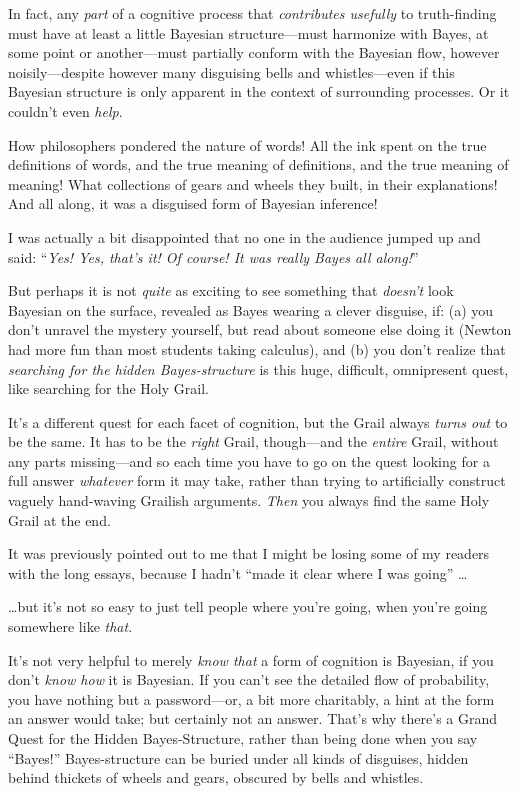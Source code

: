 {
 In fact, any \textit{part} of a cognitive process that
\textit{contributes usefully} to truth-finding must have at least a
little Bayesian structure---must harmonize with Bayes, at some point or
another---must partially conform with the Bayesian flow, however
noisily---despite however many disguising bells and whistles---even if
this Bayesian structure is only apparent in the context of surrounding
processes. Or it couldn't even \textit{help}.}

{
 How philosophers pondered the nature of words! All the ink spent
on the true definitions of words, and the true meaning of definitions,
and the true meaning of meaning! What collections of gears and wheels
they built, in their explanations! And all along, it was a disguised
form of Bayesian inference!}

{
 I was actually a bit disappointed that no one in the audience
jumped up and said: ``\textit{Yes! Yes,
that's it! Of course! It was really Bayes all
along!}''}

{
 But perhaps it is not \textit{quite} as exciting to see something
that \textit{doesn't} look Bayesian on the surface,
revealed as Bayes wearing a clever disguise, if: (a) you
don't unravel the mystery yourself, but read about
someone else doing it (Newton had more fun than most students taking
calculus), and (b) you don't realize that
\textit{searching for the hidden Bayes-structure} is this huge,
difficult, omnipresent quest, like searching for the Holy Grail.}

{
 It's a different quest for each facet of
cognition, but the Grail always \textit{turns out} to be the same. It
has to be the \textit{right} Grail, though---and the \textit{entire}
Grail, without any parts missing---and so each time you have to go on
the quest looking for a full answer \textit{whatever} form it may take,
rather than trying to artificially construct vaguely hand-waving
Grailish arguments. \textit{Then} you always find the same Holy Grail
at the end.}

{
 It was previously pointed out to me that I might be losing some of
my readers with the long essays, because I hadn't
``made it clear where I was going''
\ldots}

{
 \ldots but it's not so easy to just tell people
where you're going, when you're going
somewhere like \textit{that}.}

{
 It's not very helpful to merely \textit{know that}
a form of cognition is Bayesian, if you don't
\textit{know how} it is Bayesian. If you can't see the
detailed flow of probability, you have nothing but a password---or, a
bit more charitably, a hint at the form an answer would take; but
certainly not an answer. That's why
there's a Grand Quest for the Hidden Bayes-Structure,
rather than being done when you say
``Bayes!'' Bayes-structure can be
buried under all kinds of disguises, hidden behind thickets of wheels
and gears, obscured by bells and whistles.}

